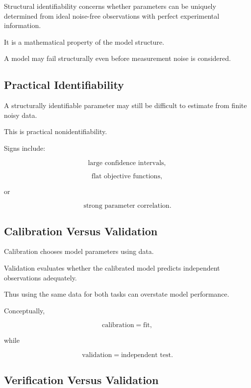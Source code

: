 Structural identifiability concerns whether parameters can be uniquely
determined from ideal noise-free observations with perfect experimental
information.

It is a mathematical property of the model structure.

A model may fail structurally even before measurement noise is considered.

\subsection{Practical Identifiability}
\label{subsec:practical-identifiability}

A structurally identifiable parameter may still be difficult to estimate
from finite noisy data.

This is practical nonidentifiability.

Signs include:

\[
\boxed{
\text{large confidence intervals},
}
\]

\[
\boxed{
\text{flat objective functions},
}
\]

or

\[
\boxed{
\text{strong parameter correlation}.
}
\]

\subsection{Calibration Versus Validation}
\label{subsec:calibration-versus-validation}

Calibration chooses model parameters using data.

Validation evaluates whether the calibrated model predicts independent
observations adequately.

Thus using the same data for both tasks can overstate model performance.

Conceptually,

\[
\boxed{
\text{calibration}
=
\text{fit},
}
\]

while

\[
\boxed{
\text{validation}
=
\text{independent test}.
}
\]

\subsection{Verification Versus Validation}
\label{subsec:simulation-verification-validation}

